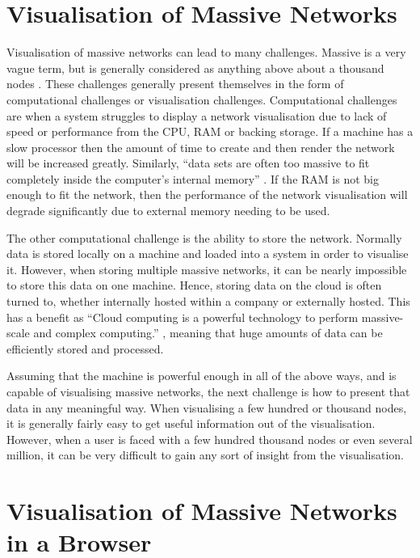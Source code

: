 \documentclass[../dissertation.tex]{subfiles}
\begin{document}
\section{Visualisation of Massive Networks}

Visualisation of massive networks can lead to many challenges. Massive is a very vague term, but is generally considered as anything above about a thousand nodes \cite{batagelj1998pajek}. These challenges generally present themselves in the form of computational challenges or visualisation challenges. Computational challenges are when a system struggles to display a network visualisation due to lack of speed or performance from the CPU, RAM or backing storage. If a machine has a slow processor then the amount of time to create and then render the network will be increased greatly. Similarly, ``data sets are often too massive to fit completely inside the computer's internal memory'' \cite{abello2013handbook}. If the RAM is not big enough to fit the network, then the performance of the network visualisation will degrade significantly due to external memory needing to be used. 

The other computational challenge is the ability to store the network. Normally data is stored locally on a machine and loaded into a system in order to visualise it. However, when storing multiple massive networks, it can be nearly impossible to store this data on one machine. Hence, storing data on the cloud is often turned to, whether internally hosted within a company or externally hosted. This has a benefit as ``Cloud computing is a powerful technology to perform massive-scale and complex computing.'' \cite{hashem2015rise}, meaning that huge amounts of data can be efficiently stored and processed.

Assuming that the machine is powerful enough in all of the above ways, and is capable of visualising massive networks, the next challenge is how to present that data in any meaningful way. When visualising a few hundred or thousand nodes, it is generally fairly easy to get useful information out of the visualisation. However, when a user is faced with a few hundred thousand nodes or even several million, it can be very difficult to gain any sort of insight from the visualisation. 

\section{Visualisation of Massive Networks in a Browser}
\end{document}
